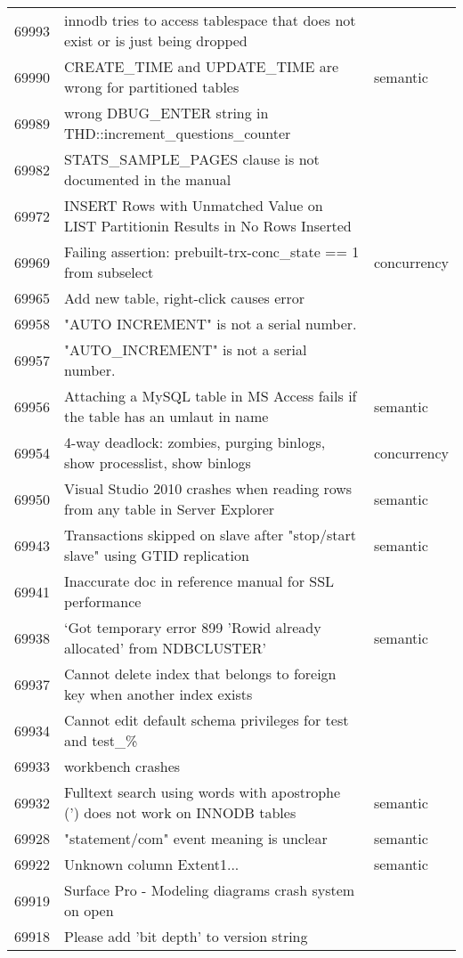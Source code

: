 \begin{longtable}[c]{p{1cm}p{10cm}p{1cm}}
69993 & innodb tries to access tablespace that does not exist or is just being dropped &  \\
69990 & CREATE\_TIME and UPDATE\_TIME are wrong for partitioned tables & semantic \\
69989 & wrong DBUG\_ENTER string in THD::increment\_questions\_counter &  \\
69982 & STATS\_SAMPLE\_PAGES clause is not documented in the manual &  \\
69972 & INSERT Rows with Unmatched Value on LIST Partitionin Results in No Rows Inserted &  \\
69969 & Failing assertion: prebuilt-trx-conc\_state == 1 from subselect & concurrency \\
69965 & Add new table, right-click causes error &  \\
69958 & "AUTO INCREMENT" is not a serial number. &  \\
69957 & "AUTO\_INCREMENT" is not a serial number. &  \\
69956 & Attaching a MySQL table in MS Access fails if the table has an umlaut in name & semantic \\
69954 & 4-way deadlock: zombies, purging binlogs, show processlist, show binlogs & concurrency \\
69950 & Visual Studio 2010 crashes when reading rows from any table in Server Explorer & semantic \\
69943 & Transactions skipped on slave after "stop/start slave" using GTID replication & semantic \\
69941 & Inaccurate doc in reference manual for SSL performance &  \\
69938 & `Got temporary error 899 'Rowid already allocated' from NDBCLUSTER' & semantic \\
69937 & Cannot delete index that belongs to foreign key when another index exists &  \\
69934 & Cannot edit default schema privileges for test and test\_\% &  \\
69933 & workbench crashes &  \\
69932 & Fulltext search using words with apostrophe (') does not work on INNODB tables & semantic \\
69928 & "statement/com" event meaning is unclear & semantic \\
69922 & Unknown column Extent1... & semantic \\
69919 & Surface Pro - Modeling diagrams crash system on open &  \\
69918 & Please add 'bit depth' to version string &  \\

\end{longtable}

